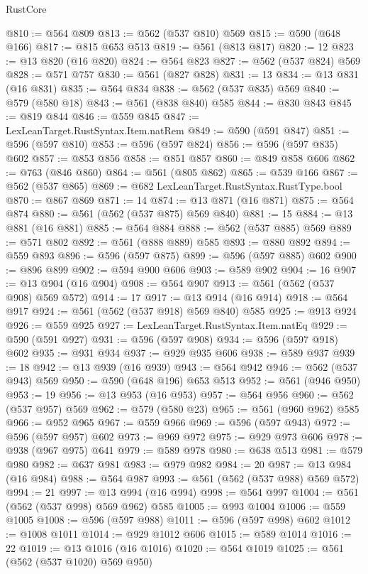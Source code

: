 \begin{lexlean}{RustCore}
\begin{coremodule}
@810 := @564 @809
@813 := @562 (@537 @810) @569
@815 := @590 (@648 @166)
@817 := @815 @653 @513
@819 := @561 (@813 @817)
@820 := 12
@823 := @13 @820 (@16 @820)
@824 := @564 @823
@827 := @562 (@537 @824) @569
@828 := @571 @757
@830 := @561 (@827 @828)
@831 := 13
@834 := @13 @831 (@16 @831)
@835 := @564 @834
@838 := @562 (@537 @835) @569
@840 := @579 (@580 @18)
@843 := @561 (@838 @840) @585
@844 := @830 @843
@845 := @819 @844
@846 := @559 @845
@847 := LexLeanTarget.RustSyntax.Item.natRem
@849 := @590 (@591 @847)
@851 := @596 (@597 @810)
@853 := @596 (@597 @824)
@856 := @596 (@597 @835) @602
@857 := @853 @856
@858 := @851 @857
@860 := @849 @858 @606
@862 := @763 (@846 @860)
@864 := @561 (@805 @862)
@865 := @539 @166
@867 := @562 (@537 @865)
@869 := @682 LexLeanTarget.RustSyntax.RustType.bool
@870 := @867 @869
@871 := 14
@874 := @13 @871 (@16 @871)
@875 := @564 @874
@880 := @561 (@562 (@537 @875) @569 @840)
@881 := 15
@884 := @13 @881 (@16 @881)
@885 := @564 @884
@888 := @562 (@537 @885) @569
@889 := @571 @802
@892 := @561 (@888 @889) @585
@893 := @880 @892
@894 := @559 @893
@896 := @596 (@597 @875)
@899 := @596 (@597 @885) @602
@900 := @896 @899
@902 := @594 @900 @606
@903 := @589 @902
@904 := 16
@907 := @13 @904 (@16 @904)
@908 := @564 @907
@913 := @561 (@562 (@537 @908) @569 @572)
@914 := 17
@917 := @13 @914 (@16 @914)
@918 := @564 @917
@924 := @561 (@562 (@537 @918) @569 @840) @585
@925 := @913 @924
@926 := @559 @925
@927 := LexLeanTarget.RustSyntax.Item.natEq
@929 := @590 (@591 @927)
@931 := @596 (@597 @908)
@934 := @596 (@597 @918) @602
@935 := @931 @934
@937 := @929 @935 @606
@938 := @589 @937
@939 := 18
@942 := @13 @939 (@16 @939)
@943 := @564 @942
@946 := @562 (@537 @943) @569
@950 := @590 (@648 @196) @653 @513
@952 := @561 (@946 @950)
@953 := 19
@956 := @13 @953 (@16 @953)
@957 := @564 @956
@960 := @562 (@537 @957) @569
@962 := @579 (@580 @23)
@965 := @561 (@960 @962) @585
@966 := @952 @965
@967 := @559 @966
@969 := @596 (@597 @943)
@972 := @596 (@597 @957) @602
@973 := @969 @972
@975 := @929 @973 @606
@978 := @938 (@967 @975) @641
@979 := @589 @978
@980 := @638 @513
@981 := @579 @980
@982 := @637 @981
@983 := @979 @982
@984 := 20
@987 := @13 @984 (@16 @984)
@988 := @564 @987
@993 := @561 (@562 (@537 @988) @569 @572)
@994 := 21
@997 := @13 @994 (@16 @994)
@998 := @564 @997
@1004 := @561 (@562 (@537 @998) @569 @962) @585
@1005 := @993 @1004
@1006 := @559 @1005
@1008 := @596 (@597 @988)
@1011 := @596 (@597 @998) @602
@1012 := @1008 @1011
@1014 := @929 @1012 @606
@1015 := @589 @1014
@1016 := 22
@1019 := @13 @1016 (@16 @1016)
@1020 := @564 @1019
@1025 := @561 (@562 (@537 @1020) @569 @950)

\end{coremodule}
\end{lexlean}
